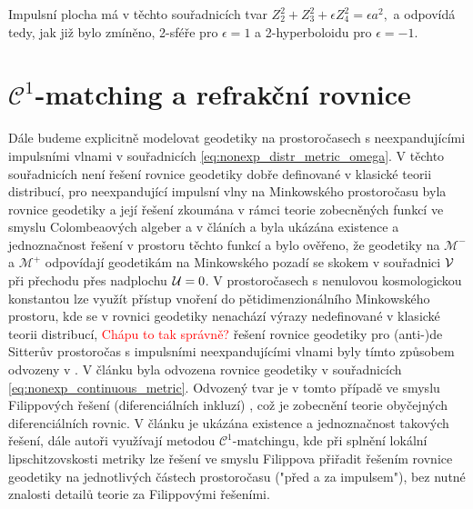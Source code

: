 Impulsní plocha má v těchto souřadnicích tvar
$Z_2^2 + Z_3^2 + \epsilon Z_4^2 = \epsilon a^2,$
a odpovídá tedy, jak již bylo zmíněno, 2-sféře pro $\epsilon=1$ a 2-hyperboloidu pro $\epsilon=-1$.

\section{$\mathcal{C}^1$-matching a refrakční rovnice}
Dále budeme explicitně modelovat geodetiky na prostoročasech s neexpandujícími impulsními vlnami v souřadnicích
\eqref{eq:nonexp_distr_metric_omega}. V těchto souřadnicích není řešení rovnice geodetiky dobře definované v
klasické teorii distribucí, pro neexpandující impulsní vlny na Minkowského prostoročasu byla rovnice geodetiky
a její řešení zkoumána v rámci teorie zobecněných funkcí ve smyslu Colombeaových algeber a v článích \cite{Steinbauer_1998} a \cite{Kunzinger_1999}
byla ukázána existence a jednoznačnost řešení v prostoru těchto funkcí a bylo ověřeno, že geodetiky na $\mathcal{M}^-$ a $\mathcal{M}^+$ odpovídají
geodetikám na Minkowského pozadí se skokem v souřadnici $\mathcal{V}$ při přechodu přes nadplochu $\mathcal{U}=0$. V prostoročasech s
nenulovou kosmologickou konstantou lze využít přístup vnoření do pětidimenzionálního Minkowského prostoru, kde se v rovnici
geodetiky nenachází výrazy nedefinované v klasické teorii distribucí, \textcolor{red}{Chápu to tak správně?} řešení rovnice geodetiky
pro (anti-)de Sitterův prostoročas s impulsními neexpandujícími vlnami byly tímto způsobem odvozeny v \cite{Podolsk__2001}.
V článku \cite{Podolsky:2014ysa} byla odvozena rovnice geodetiky v souřadnicích \eqref{eq:nonexp_continuous_metric}.
Odvozený tvar je v tomto případě ve smyslu Filippových řešení (diferenciálních inkluzí) \cite{filippov1988differential}, což je zobecnění teorie obyčejných diferenciálních rovnic.
V článku je ukázána existence a jednoznačnost takových řešení, dále autoři využívají metodou $\mathcal{C}^1$-matchingu,
kde při splnění lokální lipschitzovskosti metriky lze řešení ve smyslu Filippova přiřadit řešením rovnice geodetiky na jednotlivých částech prostoročasu
("před a za impulsem"), bez nutné znalosti detailů teorie za Filippovými řešeními.

